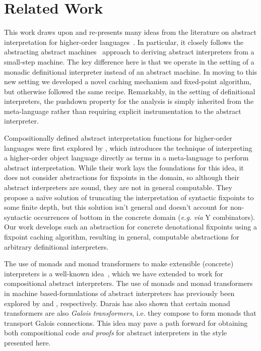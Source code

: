 \section{Related Work}\label{s:related-work}

This work draws upon and re-presents many ideas from the literature on
abstract interpretation for higher-order
languages~\cite{dvanhorn:Midtgaard2012Controlflow}.  In particular, it
closely follows the abstracting abstract
machines~\cite{dvanhorn:VanHorn2010Abstracting,dvanhorn:VanHorn2012Systematic}
approach to deriving abstract interpreters from a small-step
machine. The key difference here is that we operate in the setting of
a monadic definitional interpreter instead of an abstract machine. In
moving to this new setting we developed a novel caching mechanism and
fixed-point algorithm, but otherwise followed the same
recipe. Remarkably, in the setting of definitional interpreters, the
pushdown property for the analysis is simply inherited from the
meta-language rather than requiring explicit instrumentation to the
abstract interpreter.

Compositionally defined abstract interpretation functions for
higher-order languages were first explored by
\citet{local:jones-book1995}, which introduces the technique of
interpreting a higher-order object language directly as terms in a
meta-language to perform abstract interpretation. While their work
lays the foundations for this idea, it does not consider abstractions
for fixpoints in the domain, so although their abstract interpreters
are sound, they are not in general computable. They propose a naïve
solution of truncating the interpretation of syntactic fixpoints to
some finite depth, but this solution isn't general and doesn't account
for non-syntactic occurrences of bottom in the concrete domain (\emph{e.g.}
\emph{via} Y combinators). Our work develops such an abstraction for concrete
denotational fixpoints using a fixpoint caching algorithm, resulting in
general, computable abstractions for arbitrary definitional interpreters.

The use of monads and monad transformers to make extensible (concrete)
interpreters is a well-known
idea~\cite{davdar:Moggi:1989:Monads,local:steele-popl94,dvanhorn:Liang1995Monad},
which we have extended to work for compositional abstract
interpreters.  The use of monads and monad transformers in machine
based-formulations of abstract interpreters has previously been
explored by \citet{dvanhorn:Sergey2013Monadic} and
\citet{local:darais-oopsla2015}, respectively.  Darais has also shown
that certain monad transformers are also \emph{Galois transformers},
i.e. they compose to form monads that transport Galois connections.
This idea may pave a path forward for obtaining both compositional
code \emph{and proofs} for abstract interpreters in the style
presented here.

